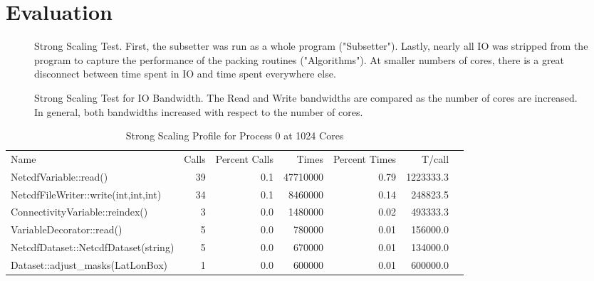 \section{Evaluation}
\label{section:evaluation}

\begin{figure}[!t]
\center
\resizebox{3.5in}{!}{

}
\caption{Strong Scaling Test.  First, the subsetter was run as a whole
program ("Subsetter").  Lastly, nearly all IO was stripped from the program
to capture the performance of the packing routines ("Algorithms").  At smaller
numbers of cores, there is a great disconnect between time spent in IO and
time spent everywhere else.}
\label{fig:strong}
\end{figure}

\begin{figure}[!t]
\center
\resizebox{3.5in}{!}{

}
\caption{Strong Scaling Test for IO Bandwidth.  The Read and Write bandwidths
are compared as the number of cores are increased.  In general, both
bandwidths increased with respect to the number of cores.}
\label{fig:strong_io}
\end{figure}

\begin{table*}[!t]
\center
\caption{Strong Scaling Profile for Process 0 at 1024 Cores}
\label{tab:strong_prof}
\begin{tabular}{lrrrrrr}
Name&Calls&Percent Calls&Times&Percent Times&T/call\\
NetcdfVariable::read()&39&0.1&47710000&0.79&1223333.3\\
NetcdfFileWriter::write(int,int,int)&34&0.1&8460000&0.14&248823.5\\
ConnectivityVariable::reindex()&3&0.0&1480000&0.02&493333.3\\
VariableDecorator::read()&5&0.0&780000&0.01&156000.0\\
NetcdfDataset::NetcdfDataset(string)&5&0.0&670000&0.01&134000.0\\
Dataset::adjust\_masks(LatLonBox)&1&0.0&600000&0.01&600000.0\\
\end{tabular}
\end{table*}

